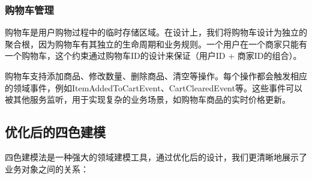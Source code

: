\documentclass[a4paper,12pt]{article}
\begin{document}
\subsubsection{购物车管理}

购物车是用户购物过程中的临时存储区域。在设计上，我们将购物车设计为独立的聚合根，因为购物车有其独立的生命周期和业务规则。一个用户在一个商家只能有一个购物车，这个约束通过购物车ID的设计来保证（用户ID + 商家ID的组合）。

购物车支持添加商品、修改数量、删除商品、清空等操作。每个操作都会触发相应的领域事件，例如ItemAddedToCartEvent、CartClearedEvent等。这些事件可以被其他服务监听，用于实现复杂的业务场景，如购物车商品的实时价格更新。

\subsection{优化后的四色建模}

四色建模法是一种强大的领域建模工具，通过优化后的设计，我们更清晰地展示了业务对象之间的关系：
\end{document}
